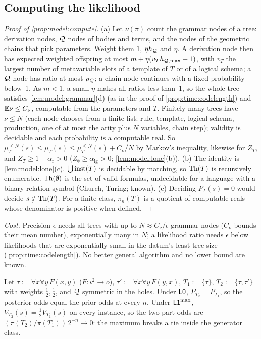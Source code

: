 \subsection{Computing the likelihood}\label{app:model:compute}

\begin{proof}[Proof of \cref{prop:model:compute}]
(a) Let $\nu(\pi)$ count the grammar nodes of a tree: derivation nodes, $\mathcal{Q}$ nodes of bodies and terms, and the nodes of the geometric chains that pick parameters. Weight them $1$, $\eta h_{\mathcal{Q}}$ and $\eta$. A derivation node then has expected weighted offspring at most $m+\eta(v_Th_{\mathcal{Q},\max}+1)$, with $v_T$ the largest number of metavariable slots of a template of $T$ or of a logical schema; a $\mathcal{Q}$ node has ratio at most $\rho_{\mathcal{Q}}$; a chain node continues with a fixed probability below~1. As $m<1$, a small $\eta$ makes all ratios less than~1, so the whole tree satisfies \cref{lem:model:grammar}(d) (as in the proof of \cref{prop:time:codelength}) and $\mathbb{E}\nu\le C_\nu$, computable from the parameters and $T$. Finitely many trees have $\nu\le N$ (each node chooses from a finite list: rule, template, logical schema, production, one of at most the arity plus $N$ variables, chain step); validity is decidable and each probability is a computable real. So $\mu^{\le N}_T(s)\le\mu_T(s)\le\mu^{\le N}_T(s)+C_\nu/N$ by Markov's inequality, likewise for $Z_T$, and $Z_T\ge1-\alpha_{\mathrm r}>0$ ($Z_\emptyset\ge\alpha_{\mathrm{lg}}>0$; \cref{lem:model:lone}(b)).
(b) The identity is \cref{lem:model:lone}(c). $\bigcup\mathrm{inst}(T)$ is decidable by matching, so $\mathrm{Th}(T)$ is recursively enumerable. $\mathrm{Th}(\emptyset)$ is the set of valid formulas, undecidable for a language with a binary relation symbol (Church, Turing; known).
(c) Deciding $P_T(s)=0$ would decide $s\notin\mathrm{Th}(T)$. For a finite class, $\pi_n(T)$ is a quotient of computable reals whose denominator is positive when defined.
\end{proof}

\emph{Cost.} Precision $\epsilon$ needs all trees with up to $N\approx C_\nu/\epsilon$ grammar nodes ($C_\nu$ bounds their mean number), exponentially many in $N$; a likelihood ratio needs $\epsilon$ below likelihoods that are exponentially small in the datum's least tree size (\cref{prop:time:codelength}). No better general algorithm and no lower bound are known.

\begin{proposition}\label{prop:model:max}
Let $\tau:=\forall x\forall y\,F(x,y)$ ($F:\iota^2\to o$), $\tau':=\forall x\forall y\,F(y,x)$, $T_1:=\{\tau\}$, $T_2:=\{\tau,\tau'\}$ with weights $\tfrac12,\tfrac12$, and $\mathcal{Q}$ symmetric in the holes. Under $\mathord{\mathsf{L0}}$, $P_{T_2}=P_{T_1}$, so the posterior odds equal the prior odds at every $n$. Under $\mathord{\mathsf{L1}}^{\max}$, $V_{T_2}(s)=\tfrac12V_{T_1}(s)$ on every instance, so the two-part odds are $(\pi(T_2)/\pi(T_1))\,2^{-n}\to0$: the maximum breaks a tie inside the generator class.
\end{proposition}

